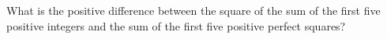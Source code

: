 What is the positive difference between the square of the sum of the first five positive integers and the sum of the first five positive perfect squares?
